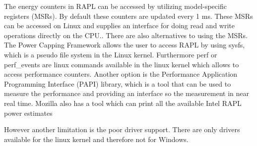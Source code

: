



The energy counters in RAPL can be accessed by utilizing model-specific registers (MSRs). By default these counters are updated every 1 ms. These MSRs can be accessed on Linux and supplies an interface for doing read and write operations directly on the CPU.\cite{linux_manual_msr}. There are also alternatives to using the MSRs. The Power Capping Framework allows the user to access RAPL by using sysfs, which is a pseudo file system in the Linux kernel\cite{PowerCappingFramework,RAPL_in_action}. Furthermore perf or perf\_events are linux commands available in the linux kernel which allows to access performance counters.\cite{Perf_events,RAPL_in_action} 
Another option is the Performance Application Programming Interface (PAPI) library, which is a tool that can be used to measure the performance and providing an interface so the measurement in near real time\cite{PAPI}.
Mozilla also has a tool which can print all the available Intel RAPL power estimates\cite{FireFox}\nytafsnit





However another limitation is the poor driver support. There are only drivers available for the linux kernel and therefore not for Windows.\cite{RAPL_in_action}  

